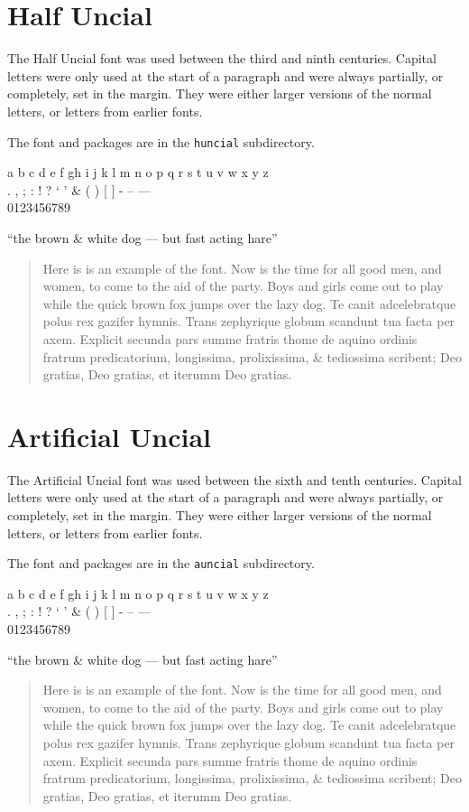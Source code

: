 \documentclass{article}
\newcommand{\abc}{a b c d e f gh i j k l m n o p q r s t u v w x y z}
\newcommand{\punct}{. , ; : ! ? ` ' \& ( ) [ ]}
\newcommand{\figs}{0123456789}
\newcommand{\dashes}{- -- ---}
\newcommand{\ligs}{``the brown \& white dog --- but fast acting hare''}
\newcommand{\sentence}{%
    now is the time for all good
men, and women, to come to the aid of the party while the quick brown fox
jumps over the lazy dog.}
\newcommand{\latin}{%
    Te canit adcelebratque polus rex gazifer hymnis.
Trans zephyrique globum scandunt tua facta per axem.
Explicit secunda pars summe fratris thome de aquino
ordinis fratrum predicatorium, longissima, prolixissima,
\& tediossima scribent; Deo gratias, Deo gratias, et iterumm
Deo gratias.
}
\renewcommand{\sentence}{%
Here is is an example of the font. Now is the time for all good
men, and women, to come to the aid of the party. Boys and girls come
out to play while the quick brown fox jumps over the lazy dog.}
\begin{document}
\clearpage
\section{Half Uncial}

    The Half Uncial font was used between the third and ninth centuries. 
Capital letters were only used at the
start of a paragraph and were always partially, or completely, set in the margin.
They were either larger versions of the normal letters, or letters from earlier
fonts.

    The font and packages are in the \texttt{huncial} subdirectory.

\begin{center}
\hunclfamily
\abc \\
\punct{} \dashes \\
\figs 

\ligs\par
\end{center}

\begin{quotation}
\renewcommand{\baselinestretch}{1.4}
\hunclfamily
\sentence{} \latin \par
\end{quotation}

\clearpage
\section{Artificial Uncial}

    The Artificial Uncial font was used between the sixth and tenth centuries. 
Capital letters were only used at the
start of a paragraph and were always partially, or completely, set in the margin.
They were either larger versions of the normal letters, or letters from earlier
fonts.

    The font and packages are in the \texttt{auncial} subdirectory.

\begin{center}
\aunclfamily
\abc \\
\punct{} \dashes \\
\figs 

\ligs\par
\end{center}

\begin{quotation}
\renewcommand{\baselinestretch}{1.4}
\aunclfamily
\sentence{} \latin \par
\end{quotation}
\end{document}
